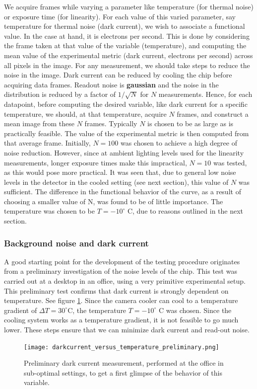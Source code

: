 \documentclass[../main.tex]{subfiles}
\begin{document}
		We acquire frames while varying a parameter like temperature (for thermal noise) or exposure time (for linearity). For each value of this varied parameter, say temperature for thermal noise (dark current), we wish to associate a functional value. In the case at hand, it is electrons per second. This is done by considering the frame taken at that value of the variable (temperature), and computing the mean value of the experimental metric (dark current, electrons per second) across all pixels in the image. For any measurement, we should take steps to reduce the noise in the image. Dark current can be reduced by cooling the chip before acquiring data frames. Readout noise is \textbf{gaussian} and the noise in the distribution is reduced by a factor of $1/\sqrt{N}$ for $N$ measurements. Hence, for each datapoint, before computing the desired variable, like dark current for a specific temperature, we should, at that temperature, acquire $N$ frames, and construct a mean image from these $N$ frames. Typically $N$ is chosen to be as large as is practically feasible. The value of the experimental metric is then computed from that average frame. Initially, $N = 100$ was chosen to achieve a high degree of noise reduction. However, since at ambient lighting levels used for the linearity measurements, longer exposure times make this impractical, $N=10$ was tested, as this would pose more practical. It was seen that, due to general low noise levels in the detector in the cooled setting (see next section), this value of $N$ was sufficient. The difference in the functional behavior of the curve, as a result of choosing a smaller value of N, was found to be of little importance. The temperature was chosen to be $T = -10^\circ$ C, due to reasons outlined in the next section.
	
		\subsubsection{Background noise and dark current}
		A good starting point for the development of the testing procedure originates from a preliminary investigation of the noise levels of the chip. This test was carried out at a desktop in an office, using a very primitive experimental setup. This preliminary test confirms that dark current is strongly dependent on temperature. See figure \ref{fig:dcprelim}. Since the camera cooler can cool to a temperature gradient of $\Delta T = 30 ^\circ $C, the temperature $T = -10 ^\circ$ C was chosen. Since the cooling system works as a temperature gradient, it is not feasible to go much lower. These steps ensure that we can minimize dark current and read-out noise.
		\begin{figure}
			\centering
			\texttt{[image: darkcurrent\_versus\_temperature\_preliminary.png]}
			\caption{Preliminary dark current measurement, performed at the office in sub-optimal settings, to get a first glimpse of the behavior of this variable.}
			\label{fig:dcprelim}
		\end{figure}
		
\end{document}
